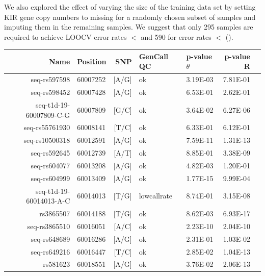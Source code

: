 We also explored the effect of varying the size of the training data set by setting KIR gene copy numbers to missing for a randomly chosen subset of samples and imputing them in the remaining samples.
We suggest that only 295 samples are required to achieve \gls{LOOCV} error rates $<$  and 590 for error rates $<$  ().


\begin{table}[h]
\begin{center}
\footnotesize
\begin{tabular}{rlrllrr}
  \hline
Name                    & Position & SNP   & GenCall QC  & p-value $\theta$  & p-value R \\
  \hline
seq-rs597598            & 60007252 & [A/G] & ok          & 3.19E-03 & 7.81E-01 \\
seq-rs598452            & 60007428 & [A/G] & ok          & 6.53E-01 & 2.62E-01 \\
\rowcolor{LightCyan}
seq-t1d-19-60007809-C-G & 60007809 & [G/C] & ok          & 3.64E-02 & 6.27E-06 \\
seq-rs55761930          & 60008141 & [T/C] & ok          & 6.33E-01 & 6.12E-01 \\
\rowcolor{LightCyan}
seq-rs10500318          & 60012591 & [A/G] & ok          & 7.59E-11 & 1.31E-13 \\
\rowcolor{LightRed}
seq-rs592645            & 60012739 & [A/T] & ok          & 8.85E-01 & 3.38E-09 \\
seq-rs604077            & 60013208 & [A/G] & ok          & 4.82E-03 & 1.20E-01 \\
\rowcolor{LightCyan}
seq-rs604999            & 60013409 & [A/G] & ok          & 1.77E-15 & 9.99E-04 \\
\rowcolor{LightCyan}
seq-t1d-19-60014013-A-C & 60014013 & [T/G] & lowcallrate & 8.74E-01 & 3.15E-08 \\
\rowcolor{LightCyan}
rs3865507               & 60014188 & [T/G] & ok          & 8.62E-03 & 6.93E-17 \\
\rowcolor{LightCyan}
seq-rs3865510           & 60016051 & [A/C] & ok          & 2.23E-10 & 2.04E-10 \\
seq-rs648689            & 60016286 & [A/G] & ok          & 2.31E-01 & 1.03E-02 \\
\rowcolor{LightCyan}
seq-rs649216            & 60016447 & [T/C] & ok          & 2.85E-02 & 1.04E-13 \\
\rowcolor{LightCyan}
rs581623                & 60018551 & [A/G] & ok          & 3.76E-02 & 2.06E-13 \\

\end{tabular}
\end{center}
\end{table}
